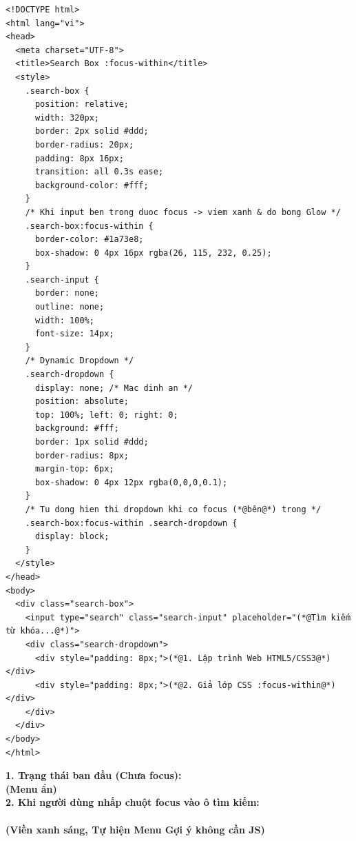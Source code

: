 \begin{codeWindow}
\begin{lstlisting}[language=HTML5]
<!DOCTYPE html>
<html lang="vi">
<head>
  <meta charset="UTF-8">
  <title>Search Box :focus-within</title>
  <style>
    .search-box {
      position: relative;
      width: 320px;
      border: 2px solid #ddd;
      border-radius: 20px;
      padding: 8px 16px;
      transition: all 0.3s ease;
      background-color: #fff;
    }
    /* Khi input ben trong duoc focus -> viem xanh & do bong Glow */
    .search-box:focus-within {
      border-color: #1a73e8;
      box-shadow: 0 4px 16px rgba(26, 115, 232, 0.25);
    }
    .search-input {
      border: none;
      outline: none;
      width: 100%;
      font-size: 14px;
    }
    /* Dynamic Dropdown */
    .search-dropdown {
      display: none; /* Mac dinh an */
      position: absolute;
      top: 100%; left: 0; right: 0;
      background: #fff;
      border: 1px solid #ddd;
      border-radius: 8px;
      margin-top: 6px;
      box-shadow: 0 4px 12px rgba(0,0,0,0.1);
    }
    /* Tu dong hien thi dropdown khi co focus (*@bên@*) trong */
    .search-box:focus-within .search-dropdown {
      display: block;
    }
  </style>
</head>
<body>
  <div class="search-box">
    <input type="search" class="search-input" placeholder="(*@Tìm kiếm từ khóa...@*)">
    <div class="search-dropdown">
      <div style="padding: 8px;">(*@1. Lập trình Web HTML5/CSS3@*)</div>
      <div style="padding: 8px;">(*@2. Giả lớp CSS :focus-within@*)</div>
    </div>
  </div>
</body>
</html>
\end{lstlisting}
\end{codeWindow}

\begin{browserWindow}
\sffamily\small
\textbf{1. Trạng thái ban đầu (Chưa focus):}\\[2pt]
 \quad \textcolor{gray!70}{\bfseries (Menu ẩn)}\\[8pt]
\textbf{2. Khi người dùng nhấp chuột focus vào ô tìm kiếm:}\\[2pt]
\\[-4pt]
 \quad \textcolor{primaryBlue}{\bfseries (Viền xanh sáng, Tự hiện Menu Gợi ý không cần JS)}
\end{browserWindow}

